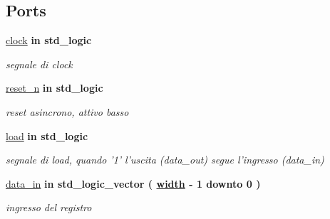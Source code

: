 \subsection*{Ports}
 \begin{DoxyCompactItemize}
\item 
\hyperlink{group___generic_buffer_gadfc2d5e995e9c6876b2e55bf6a5c4071}{clock}  {\bfseries {\bfseries \textcolor{vhdlchar}{in}\textcolor{vhdlchar}{ }}} {\bfseries \textcolor{vhdlchar}{std\+\_\+logic}\textcolor{vhdlchar}{ }} 
\begin{DoxyCompactList}\small\item\em segnale di clock \end{DoxyCompactList}\item 
\hyperlink{group___generic_buffer_ga446ea52ed8c4a84181a47d9165ce41a5}{reset\+\_\+n}  {\bfseries {\bfseries \textcolor{vhdlchar}{in}\textcolor{vhdlchar}{ }}} {\bfseries \textcolor{vhdlchar}{std\+\_\+logic}\textcolor{vhdlchar}{ }} 
\begin{DoxyCompactList}\small\item\em reset asincrono, attivo basso \end{DoxyCompactList}\item 
\hyperlink{group___generic_buffer_gaba761f7740d0b6257a0e283b3734ddbf}{load}  {\bfseries {\bfseries \textcolor{vhdlchar}{in}\textcolor{vhdlchar}{ }}} {\bfseries \textcolor{vhdlchar}{std\+\_\+logic}\textcolor{vhdlchar}{ }} 
\begin{DoxyCompactList}\small\item\em segnale di load, quando '1' l'uscita (data\+\_\+out) segue l'ingresso (data\+\_\+in) \end{DoxyCompactList}\item 
\hyperlink{group___generic_buffer_ga597910698848749da5951285c85fa4f9}{data\+\_\+in}  {\bfseries {\bfseries \textcolor{vhdlchar}{in}\textcolor{vhdlchar}{ }}} {\bfseries \textcolor{vhdlchar}{std\+\_\+logic\+\_\+vector}\textcolor{vhdlchar}{ }\textcolor{vhdlchar}{(}\textcolor{vhdlchar}{ }\textcolor{vhdlchar}{ }\textcolor{vhdlchar}{ }\textcolor{vhdlchar}{ }{\bfseries \hyperlink{group___generic_buffer_gae47d961480346c1d82439a66505e6e7d}{width}} \textcolor{vhdlchar}{-\/}\textcolor{vhdlchar}{ } \textcolor{vhdldigit}{1} \textcolor{vhdlchar}{ }\textcolor{vhdlchar}{downto}\textcolor{vhdlchar}{ }\textcolor{vhdlchar}{ } \textcolor{vhdldigit}{0} \textcolor{vhdlchar}{ }\textcolor{vhdlchar}{)}\textcolor{vhdlchar}{ }} 
\begin{DoxyCompactList}\small\item\em ingresso del registro \end{DoxyCompactList}\item 

\end{DoxyCompactItemize}
